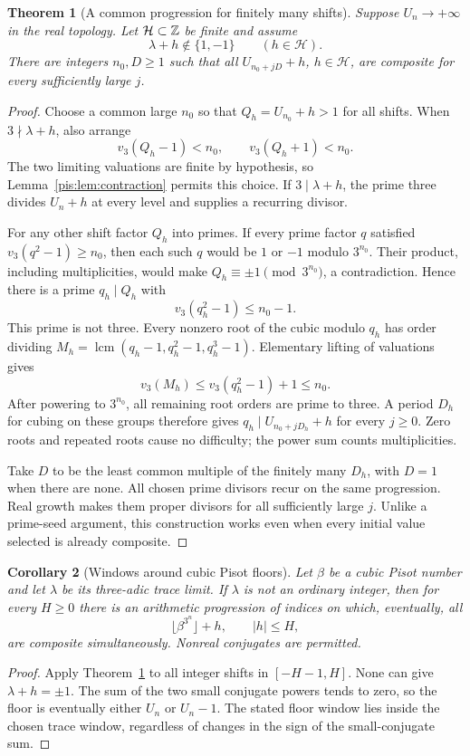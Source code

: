 \documentclass[11pt,a4paper]{article}
\newtheorem{theorem}{Theorem}[section]
\newtheorem{corollary}[theorem]{Corollary}
\theoremstyle{definition}\newtheorem{definition}[theorem]{Definition}
\theoremstyle{remark}\newtheorem{remark}[theorem]{Remark}
\begin{document}
\begin{theorem}[A common progression for finitely many shifts]
\label{pis:thm:windows}
Suppose $U_n\to+\infty$ in the real topology. Let
$\mathcal H\subset\mathbb Z$ be finite and assume
\[
 \lambda+h\notin\{1,-1\}\qquad(h\in\mathcal H).
\]
There are integers $n_0,D\ge1$ such that all
$U_{n_0+jD}+h$, $h\in\mathcal H$, are composite for every
sufficiently large $j$.
\end{theorem}
\begin{proof}
Choose a common large $n_0$ so that $Q_h=U_{n_0}+h>1$ for all
shifts. When $3\nmid\lambda+h$, also arrange
\[
 v_3(Q_h-1)<n_0,\qquad v_3(Q_h+1)<n_0.
\]
The two limiting valuations are finite by hypothesis, so
Lemma~\ref{pis:lem:contraction} permits this choice.
If $3\mid\lambda+h$, the prime three divides $U_n+h$ at every
level and supplies a recurring divisor.

For any other shift factor $Q_h$ into primes. If every prime factor
$q$ satisfied $v_3(q^2-1)\ge n_0$, then each such $q$ would be
$1$ or $-1$ modulo $3^{n_0}$. Their product, including
multiplicities, would make $Q_h\equiv\pm1\pmod{3^{n_0}}$,
a contradiction. Hence there is a prime $q_h\mid Q_h$ with
\[
 v_3(q_h^2-1)\le n_0-1.
\]
This prime is not three. Every nonzero root of the cubic modulo
$q_h$ has order dividing
$M_h=\operatorname{lcm}(q_h-1,q_h^2-1,q_h^3-1)$.
Elementary lifting of valuations gives
\[
 v_3(M_h)\le v_3(q_h^2-1)+1\le n_0.
\]
After powering to $3^{n_0}$, all remaining root orders are prime
to three. A period $D_h$ for cubing on these groups therefore gives
$q_h\mid U_{n_0+jD_h}+h$ for every $j\ge0$. Zero roots and repeated
roots cause no difficulty; the power sum counts multiplicities.

Take $D$ to be the least common multiple of the finitely many
$D_h$, with $D=1$ when there are none. All chosen prime divisors recur on the same progression.
Real growth makes them proper divisors for all sufficiently large
$j$. Unlike a prime-seed argument, this construction works even
when every initial value selected is already composite.
\end{proof}

\begin{corollary}[Windows around cubic Pisot floors]\label{pis:cor:pisotwindows}
Let $\beta$ be a cubic Pisot number and let $\lambda$ be its
three-adic trace limit. If $\lambda$ is not an ordinary integer,
then for every $H\ge0$ there is an arithmetic progression of indices
on which, eventually, all
\[
 \lfloor\beta^{3^n}\rfloor+h,\qquad |h|\le H,
\]
are composite simultaneously. Nonreal conjugates are permitted.
\end{corollary}
\begin{proof}
Apply Theorem~\ref{pis:thm:windows} to all integer shifts in
$[-H-1,H]$. None can give $\lambda+h=\pm1$. The sum of the two
small conjugate powers tends to zero, so the floor is eventually
either $U_n$ or $U_n-1$. The stated floor window lies inside the
chosen trace window, regardless of changes in the sign of the
small-conjugate sum.
\end{proof}
\end{document}
